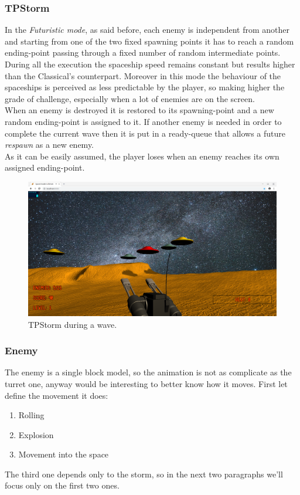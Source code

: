 \subsubsection{TPStorm}
In the \textit{Futuristic mode}, as said before, each enemy is independent from another and starting from one of the two fixed spawning points it has to reach a random ending-point passing through a fixed number of random intermediate points. During all the execution the spaceship speed remains constant but results higher than the Classical's counterpart. Moreover in this mode the behaviour of the spaceships is perceived as less predictable by the player, so making higher the grade of challenge, especially when a lot of enemies are on the screen.\\
When an enemy is destroyed it is restored to its spawning-point and a new random ending-point is assigned to it. If another enemy is needed in order to complete the current wave then it is put in a ready-queue that allows a future \textit{respawn} as a new enemy.\\
As it can be easily assumed, the player loses when an enemy reaches its own assigned ending-point.
\begin{figure}[h!]
\begin{center}
\includegraphics[scale=0.18]{images/onGoing_TPStorm.png}
\caption{TPStorm during a wave.}
\end{center}
\end{figure}

\subsubsection{Enemy}
The enemy is a single block model, so the animation is not as complicate as the turret one, anyway would be interesting to better know how it moves. First let define the movement it does:
\begin{enumerate}
\item Rolling
\item Explosion
\item Movement into the space
\end{enumerate}
The third one depends only to the storm, so in the next two paragraphs we'll focus only on the first two ones.
